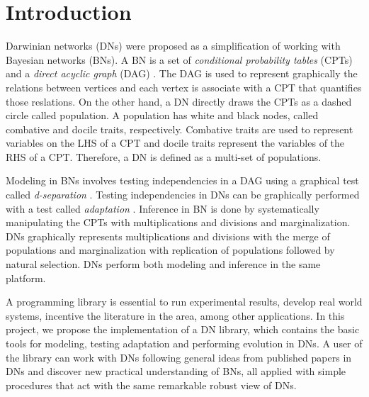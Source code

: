%
\chapter{Introduction}
\label{sec:intro}


Darwinian networks (DNs) \cite{butzOliveiraSantosCai15} were proposed as a simplification of working with Bayesian networks (BNs).
A BN is a set of \emph{conditional probability tables} (CPTs) and a \emph{direct acyclic graph} (DAG) \cite{pear88}.
The DAG is used to represent graphically the relations between vertices and each vertex is associate with a CPT that quantifies those reslations.
On the other hand, a DN directly draws the CPTs as a dashed circle called population.
A population has white and black nodes, called combative and docile traits, respectively.
Combative traits are used to represent variables on the LHS of a CPT and docile traits represent the variables of the RHS of a CPT.
Therefore, a DN is defined as a multi-set of populations.

Modeling in BNs involves testing independencies in a DAG using a graphical test called \emph{d-separation} \cite{pear88}.
Testing independencies in DNs can be graphically performed with a test called \emph{adaptation} \cite{butzOliveiraSantosCai15}.
Inference in BN is done by systematically manipulating the CPTs with multiplications and divisions and marginalization.
DNs graphically represents multiplications and divisions with the merge of populations and marginalization with replication of populations followed by natural selection.
DNs perform both modeling and inference in the same platform.

A programming library is essential to run experimental results, develop real world systems, incentive the literature in the area, among other applications.
In this project, we propose the implementation of a DN library, which contains the basic tools for modeling, testing adaptation and performing evolution in DNs.
A user of the library can work with DNs following general ideas from published papers in DNs \cite{butzOliveiraSantosCai15} and discover new practical understanding of BNs, all applied with simple procedures that act with the same remarkable robust view of DNs.

